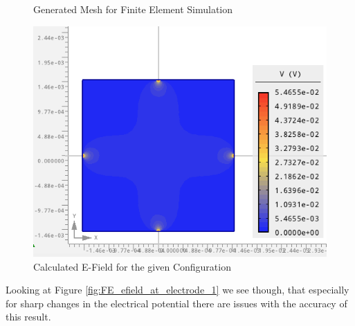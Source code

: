 \documentclass{article}
\begin{document}
\begin{figure}[htbp]
\begin{minipage}[b]{0.3\textwidth}
            \caption{Generated Mesh for Finite Element Simulation}
            \label{fig:FE_mesh_1}
        \end{minipage}
        \hfill
        \begin{minipage}[b]{0.3\textwidth}
            \includegraphics[width=\textwidth]{FE_efield_1}
            \caption{Calculated E-Field for the given Configuration}
            \label{fig:FE_efield_1}
        \end{minipage}
    \end{figure}

    Looking at Figure \ref{fig:FE_efield_at_electrode_1} we see though, that especially for sharp changes in the electrical potential there are issues with the accuracy of this result.
\end{document}
